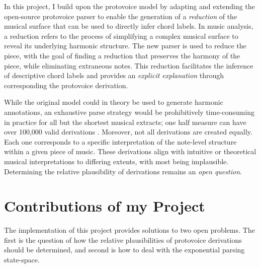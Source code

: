 \documentclass[12pt,a4paper,twoside,openany]{report} \usepackage[pdfborder={0 0 0}]{hyperref}    %
\theoremstyle{definition} \newtheorem{definition}{Definition}[section]
\begin{document}
    In this project, I build upon the protovoice model by adapting and extending the open-source protovoice parser 
    \cite{finkensiepProtovoicesModelTonal2021} to enable the generation of a \textit{reduction} of the musical
    surface that can be used to directly infer chord labels. In music analysis, a reduction refers to the process
    of simplifying a complex musical surface to reveal its underlying harmonic structure. 
    The new parser is used to reduce the piece, with the goal of finding a reduction that preserves the harmony of
    the piece, while eliminating extraneous notes. This reduction facilitates the inference of descriptive chord labels and provides an
    \textit{explicit explanation} through corresponding the protovoice derivation.  

    While the original model could in theory be used to generate harmonic annotations, an exhaustive parse strategy
    would be prohibitively time-consuming in practice for all but the shortest musical extracts; one half measure can
    have over 100,000 valid derivations \cite{finkensiepStructureFreePolyphony2023}. Moreover, not all derivations
    are created equally. Each one corresponds to a specific interpretation of the note-level structure 
    within a given piece of music. These derivations align with intuitive or theoretical musical interpretations 
    to differing extents, with most being implausible. 
    Determining the relative plausibility of derivations remains an \textit{open question}. 

    \section{Contributions of my Project}

    The implementation of this project provides solutions to two open problems. The first is the question of how the relative plausibilities of protovoice derivations should be determined, and second is how to deal with the exponential parsing state-space.
\end{document}
